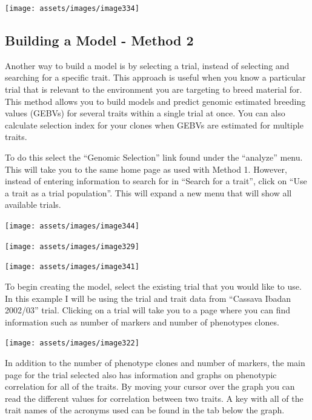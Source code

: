 \documentclass[
  12pt,
]{book}
\begin{document}
\begin{center}\texttt{[image: assets/images/image334]} \end{center}

\hypertarget{method-2}{%
\subsection{Building a Model - Method 2}\label{method-2}}

Another way to build a model is by selecting a trial, instead of selecting and searching for a specific trait. This approach is useful when you know a particular trial that is relevant to the environment you are targeting to breed material for. This method allows you to build models and predict genomic estimated breeding values (GEBVs) for several traits within a single trial at once. You can also calculate selection index for your clones when GEBVs are estimated for multiple traits.

To do this select the ``Genomic Selection'' link found under the ``analyze'' menu. This will take you to the same home page as used with Method 1. However, instead of entering information to search for in ``Search for a trait'', click on ``Use a trait as a trial population''. This will expand a new menu that will show all available trials.

\begin{center}\texttt{[image: assets/images/image344]} \end{center}

\begin{center}\texttt{[image: assets/images/image329]} \end{center}

\begin{center}\texttt{[image: assets/images/image341]} \end{center}

To begin creating the model, select the existing trial that you would like to use. In this example I will be using the trial and trait data from ``Cassava Ibadan 2002/03'' trial. Clicking on a trial will take you to a page where you can find information such as number of markers and number of phenotypes clones.

\begin{center}\texttt{[image: assets/images/image322]} \end{center}

In addition to the number of phenotype clones and number of markers, the main page for the trial selected also has information and graphs on phenotypic correlation for all of the traits. By moving your cursor over the graph you can read the different values for correlation between two traits. A key with all of the trait names of the acronyms used can be found in the tab below the graph.
\end{document}
